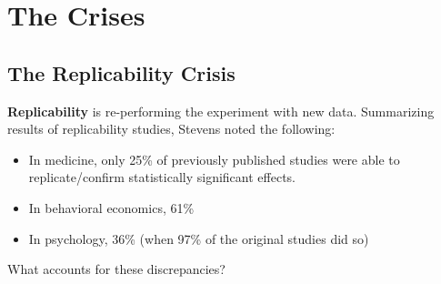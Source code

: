 \documentclass[
  english,
]{book}
\providecommand{\tightlist}{%
  \setlength{\itemsep}{0pt}\setlength{\parskip}{0pt}}
\begin{document}
\hypertarget{the-crises}{%
\section{The Crises}\label{the-crises}}

\hypertarget{the-replicability-crisis}{%
\subsection{The Replicability Crisis}\label{the-replicability-crisis}}

\textbf{Replicability} is re-performing the experiment with new data. Summarizing results of replicability studies, Stevens \citeyearpar{stevens_replicability_2017} noted the following:

\begin{itemize}
\tightlist
\item
  In medicine, only 25\% of previously published studies were able to replicate/confirm statistically significant effects.
\item
  In behavioral economics, 61\%
\item
  In psychology, 36\% (when 97\% of the original studies did so)
\end{itemize}

What accounts for these discrepancies?
\end{document}
